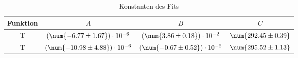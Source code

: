 \begin{table}
 \centering
 \begin{tabular}{c c c c}
 \toprule
{Funktion} & {$A$} & {$B$} & {$C$} \\
\midrule
 T & $(\num{-6.77 \pm 1.67})\cdot 10^{-6}$ & $(\num{3.86 \pm 0.18})\cdot 10^{-2}$ & $\num{292.45 \pm 0.39}$ \\
T & $(\num{-10.98 \pm 4.88})\cdot 10^{-6}$ & $(\num{-0.67 \pm 0.52})\cdot 10^{-2}$ & $\num{295.52 \pm 1.13}$ \\
\bottomrule
 \end{tabular}
 \caption{Konstanten des Fits}
 \label{tab: fitconst}
  \end{table}
